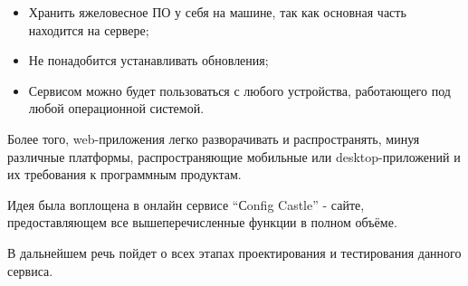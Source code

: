 \begin{itemize}
    \item Хранить яжеловесное ПО у себя на машине, так как основная часть находится на сервере;
    \item Не понадобится устанавливать обновления;
    \item Сервисом можно будет пользоваться с любого устройства, работающего под любой операционной системой.
\end{itemize}

Более того, web-приложения легко разворачивать и распространять, минуя различные платформы,
распространяющие мобильные или desktop-приложений и их требования к программным продуктам.

Идея была воплощена в онлайн сервисе “Сonfig Castle” - сайте, предоставляющем все вышеперечисленные функции в полном объёме.

В дальнейшем речь пойдет о всех этапах проектирования и тестирования данного сервиса.

